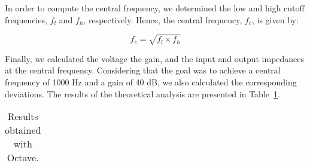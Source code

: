 \vspace{4mm}

In order to compute the central frequency, we determined the low and high cutoff frequencies, $f_l$ and $f_h$, respectively. Hence, the central frequency, $f_c$, is given by:

\begin{equation}
f_c=\sqrt{f_l\times f_h}
\end{equation}

Finally, we calculated the voltage the gain, and the input and output impedances at the central frequency. Considering that the goal was to achieve a central frequency of 1000 Hz and a gain of 40 dB, we also calculated the corresponding deviations. The results of the theoretical analysis are presented in Table~\ref{tab:resultsteo}.

\begin{table}[H]
  \centering
  \begin{tabular}{|l|r|}
    \hline    
    
  \end{tabular}
  \caption{Results obtained with Octave.}
  \label{tab:resultsteo}
\end{table}


